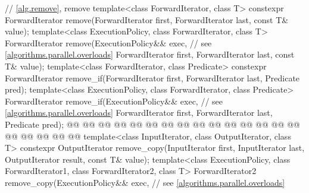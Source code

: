 \begin{codeblock}
{  // \ref{alg.remove}, remove
  template<class ForwardIterator, class T>
    constexpr ForwardIterator remove(ForwardIterator first, ForwardIterator last,
                                     const T& value);
  template<class ExecutionPolicy, class ForwardIterator, class T>
    ForwardIterator remove(ExecutionPolicy&& exec, // see \ref{algorithms.parallel.overloads}
                           ForwardIterator first, ForwardIterator last,
                           const T& value);
  template<class ForwardIterator, class Predicate>
    constexpr ForwardIterator remove_if(ForwardIterator first, ForwardIterator last,
                                        Predicate pred);
  template<class ExecutionPolicy, class ForwardIterator, class Predicate>
    ForwardIterator remove_if(ExecutionPolicy&& exec, // see \ref{algorithms.parallel.overloads}
                              ForwardIterator first, ForwardIterator last,
                              Predicate pred);
  @@
    @@
      @@
        @@
      @@
    @@
      @@
        @@
      @@
        @@
    @@
        @@
      @@
      @@
    @@
        @@
      @@
      @@
        @@
  @\added{\}}@
  template<class InputIterator, class OutputIterator, class T>
    constexpr OutputIterator
      remove_copy(InputIterator first, InputIterator last,
                  OutputIterator result, const T& value);
  template<class ExecutionPolicy, class ForwardIterator1, class ForwardIterator2,
           class T>
    ForwardIterator2
      remove_copy(ExecutionPolicy&& exec, // see \ref{algorithms.parallel.overloads}
}
\end{codeblock}
